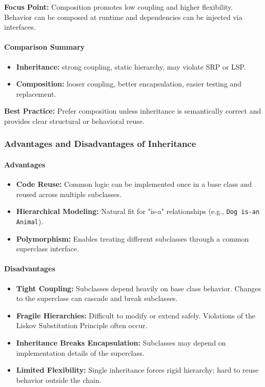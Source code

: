 \documentclass[a4paper,12pt]{article}
\begin{document}
\textbf{Focus Point:} Composition promotes low coupling and higher flexibility. Behavior can be composed at runtime and dependencies can be injected via interfaces.

\paragraph{Comparison Summary}
\begin{itemize}
  \item \textbf{Inheritance:} strong coupling, static hierarchy, may violate SRP or LSP.
  \item \textbf{Composition:} looser coupling, better encapsulation, easier testing and replacement.
\end{itemize}

\textbf{Best Practice:} Prefer composition unless inheritance is semantically correct and provides clear structural or behavioral reuse.

\subsubsection{Advantages and Disadvantages of Inheritance}

\paragraph{Advantages}

\begin{itemize}
  \item \textbf{Code Reuse:} Common logic can be implemented once in a base class and reused across multiple subclasses.
  \item \textbf{Hierarchical Modeling:} Natural fit for "is-a" relationships (e.g., \texttt{Dog is-an Animal}).
  \item \textbf{Polymorphism:} Enables treating different subclasses through a common superclass interface.
\end{itemize}

\paragraph{Disadvantages}

\begin{itemize}
  \item \textbf{Tight Coupling:} Subclasses depend heavily on base class behavior. Changes to the superclass can cascade and break subclasses.
  \item \textbf{Fragile Hierarchies:} Difficult to modify or extend safely. Violations of the Liskov Substitution Principle often occur.
  \item \textbf{Inheritance Breaks Encapsulation:} Subclasses may depend on implementation details of the superclass.
  \item \textbf{Limited Flexibility:} Single inheritance forces rigid hierarchy; hard to reuse behavior outside the chain.
\end{itemize}
\end{document}
